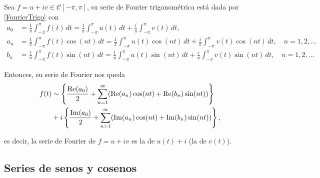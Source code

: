 




Sea $f = u + iv \in \mathscr{C}[-\pi,\pi]$, su serie de Fourier trigonométrica está dada por \eqref{FourierTrigo} con 
\begin{align*}
    a_0 &= \frac{1}{\pi} \int_{-\pi}^{\pi} f(t) \,dt =  \frac{1}{\pi} \int_{-\pi}^{\pi} u(t) \,dt + \frac{i}{\pi} \int_{-\pi}^{\pi} v(t) \,dt,\\
    a_n &= \frac{1}{\pi} \int_{-\pi}^{\pi} f(t) \cos(nt) \,dt = \frac{1}{\pi} \int_{-\pi}^{\pi} u(t) \cos(nt) \,dt + \frac{i}{\pi} \int_{-\pi}^{\pi} v(t) \cos(nt) \,dt , \quad n = 1,2, \dots\\
    b_n &= \frac{1}{\pi} \int_{-\pi}^{\pi} f(t) \sin(nt) \,dt = \frac{1}{\pi} \int_{-\pi}^{\pi} u(t) \sin(nt) \,dt + \frac{i}{\pi} \int_{-\pi}^{\pi} v(t) \sin(nt) \,dt, \quad n = 1,2, \dots
\end{align*}

Entonces, su serie de Fourier nos queda
\begin{align*}
  f(t) & \sim   \left\{ \frac{\operatorname{Re}(a_0)}{2} + \sum_{n=1}^{\infty} ( \operatorname{Re}(a_n) \cos(nt) + \operatorname{Re}(b_n) \sin(nt) ) \right\}  \\
   &  + i \left\{ \frac{\operatorname{Im}(a_0)}{2} + \sum_{n=1}^{\infty} (\operatorname{Im}(a_n) \cos(nt) + \operatorname{Im}(b_n) \sin(nt)) \right\},
\end{align*}

es decir, la serie de Fourier de $f = u + iv$ es la de $u(t) + i$ (la de $v(t)$). 

\subsection{Series de senos y cosenos}

